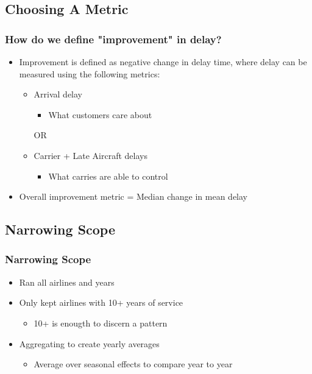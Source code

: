 \documentclass{beamer}
\begin{document}
\subsection{Choosing A Metric}
\begin{frame}
\frametitle{How do we define "improvement" in delay?}
\begin{itemize}
\item Improvement is defined as negative change in delay time, where delay can be measured using the following metrics:

\begin{itemize}
\item Arrival delay 
\begin{itemize}
\item What customers care about
\end{itemize}

OR
\item Carrier + Late Aircraft delays 
\begin{itemize}
\item What carries are able to control 
\end{itemize}
\end{itemize}
\item Overall improvement metric = Median change in mean delay 
\end{itemize}

\end{frame}

\subsection{Narrowing Scope}
\begin{frame}
\frametitle{Narrowing Scope}
\begin{itemize}
\item Ran all airlines and years 
\item Only kept airlines with 10+ years of service 
\begin{itemize}
\item 10+ is enougth to discern a pattern
\end{itemize}
\item Aggregating to create yearly averages 
\begin{itemize}
\item Average over seasonal effects to compare year to year 
\end{itemize}
\end{itemize}

\end{frame}
\end{document}
